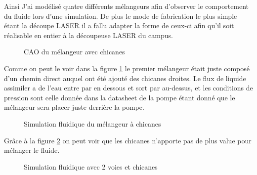 \documentclass[a4paper, 11pt]{article}
\begin{document}
Ainsi J'ai modélisé quatre différents mélangeurs afin d'observer le comportement du fluide lors d'une simulation.
De plus le mode de fabrication le plus simple étant la découpe LASER il a fallu adapter la forme de ceux-ci afin qu'il soit réalisable en entier à la découpeuse LASER du campus.
\begin{figure}[H]
    \centering
    \caption{CAO du mélangeur avec chicanes}
    \label{fig:CAO_prototype_melangeur}
\end{figure}
Comme on peut le voir dans la figure \ref{fig:CAO_prototype_melangeur} le premier mélangeur était juste composé d'un chemin direct auquel ont été ajouté des chicanes droites.
Le flux de liquide assimiler a de l'eau entre par en dessous et sort par au-dessus, et les conditions de pression sont celle donnée dans la datasheet de la pompe étant donné que le mélangeur sera placer juste derrière la pompe.
\begin{figure}[H]
    \centering
    \caption{Simulation fluidique du mélangeur à chicanes}
    \label{fig:simulation2}
\end{figure}
Grâce à la figure \ref{fig:simulation2} on peut voir que les chicanes n'apporte pas de plus value pour mélanger le fluide.
\begin{figure}[H]
    \centering
    \caption{Simulation fluidique avec 2 voies et chicanes}
    \label{fig:simulation3}
\end{figure}
\end{document}
